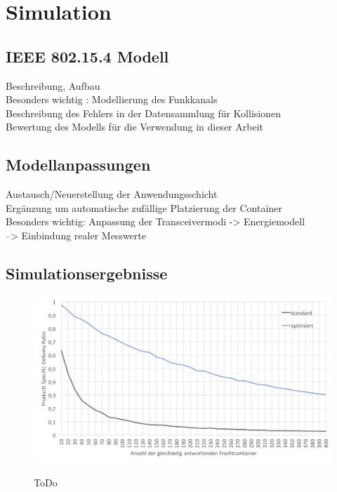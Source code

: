 \chapter{Simulation}\label{kap:simulation}
\section{IEEE 802.15.4 Modell}\label{kap:simulation_sec:beschreibung}
Beschreibung, Aufbau \\
Besonders wichtig : Modellierung des Funkkanals \\
Beschreibung des Fehlers in der Datensammlung für Kollisionen \\
Bewertung des Modells für die Verwendung in dieser Arbeit \\

\section{Modellanpassungen}\label{kap:simulation_sec:anpassung}
Austausch/Neuerstellung der Anwendungsschicht \\
Ergänzung um automatische zufällige Platzierung der Container \\
Besonders wichtig: Anpassung der Transceivermodi -> Energiemodell \\
--> Einbindung realer Messwerte \\

\section{Simulationsergebnisse}\label{kap:simulation_sec:ergebnisse}
\begin{figure}[bth]
        \myfloatalign
        {\includegraphics[width=1\linewidth]{gfx/Diag_Durchsatz_10_400}} 
        \caption[Durchsatz]{ToDo}\label{fig:diag_durchsatz_10_400}
\end{figure}

